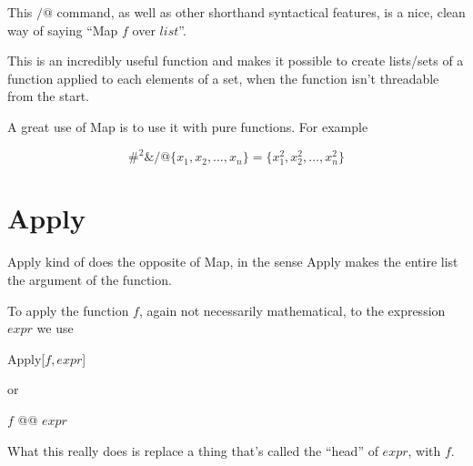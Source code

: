 \documentclass[11pt,letterpaper,twoside,titlepage]{book}
\begin{document}
				This $/@$ command, as well as other shorthand syntactical features, is a nice, clean way of saying ``Map $f$ over $list$''.
				
				This is an incredibly useful function and makes it possible to create lists/sets of a function applied to each elements of a set, when the function isn't threadable from the start.  
				
				A great use of Map is to use it with pure functions.  For example
				
				\[ \#^2 \& /@\{ x_1, x_2, \dots, x_n \} = \{ x_1^2, x_2^2, \dots, x_n^2 \} \]
				
			\section{Apply}
			
				Apply kind of does the opposite of Map, in the sense Apply makes the entire list the argument of the function.  
				
				To apply the function $f$, again not necessarily mathematical, to the expression $expr$ we use
				
				\begin{center}
				
					Apply[$f, expr$]
				
				\end{center}
				
				or 
				
				\begin{center}
				
					$f$ @@ $expr$
				
				\end{center}
				
				What this really does is replace a thing that's called the ``head'' of $expr$, with $f$.
				
%			
%				
%				
%				
%				
%				
		
\end{document}
